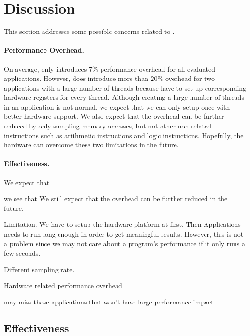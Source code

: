 \section{Discussion}

\label{sec:discuss}

This section addresses some possible concerns related to \Cheetah{}. 

\paragraph{Performance Overhead.} On average, \Cheetah{} only introduces 7\% performance overhead for all evaluated applications. However, \cheetah{} does introduce more than 20\% overhead for two applications with a large number of threads because \cheetah{} have to set up corresponding hardware registers for every thread. Although creating a large number of threads in an application is not normal, we expect that we can only setup once with better hardware support. We also expect that the overhead can be further reduced by only sampling memory accesses, but not other non-related instructions such as arithmetic instructions and logic instructions. Hopefully, the hardware can overcome these two limitations in the future.

\paragraph{Effectiveness.} 

We expect that 


we see that \Cheetah{} We still expect that the overhead can be further reduced in the future.  

Limitation. 
We have to setup the hardware platform at first. 
Then Applications needs to run long enough in order to get meaningful results. 
However, this is not a problem since we may not care about a program's performance if it only runs a few seconds. 

Different sampling rate. 

Hardware related performance overhead 


\Cheetah{} may miss those applications that won't have large performance impact. 

\subsection{Effectiveness}
